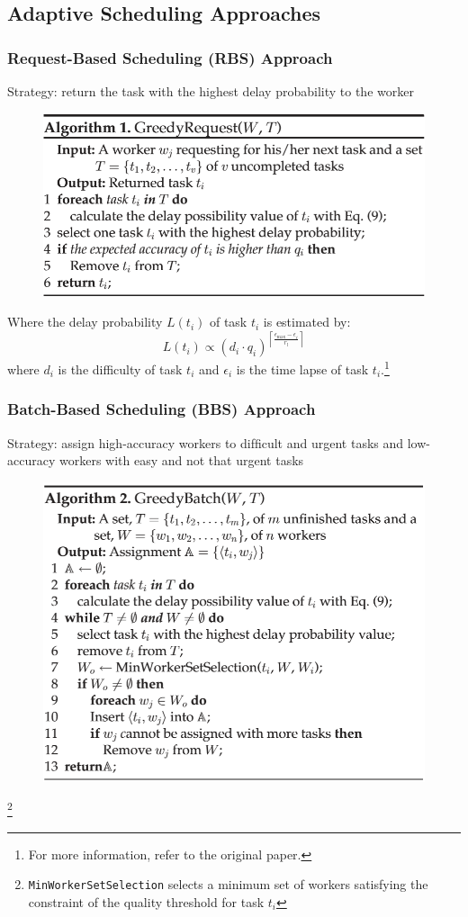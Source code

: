 \documentclass[UTF8]{beamer}
\begin{document}
\subsection{Adaptive Scheduling Approaches}

\begin{frame}
    \frametitle{Request-Based Scheduling (RBS) Approach}
    Strategy: return the task with the highest delay probability to the worker
    \begin{figure}
        \includegraphics[width= 0.65\linewidth]{ALGO1.png}
     \end{figure}
     Where the delay probability $L(t_i)$ of task $t_i$ is estimated by:
     $$
     L\left(t_{i}\right) \propto\left(d_{i} \cdot q_{i}\right)^{\left\lceil\frac{\epsilon_{\max }-\epsilon_{i}}{r_{l}}\right\rceil}
     $$
     where $d_i$ is the difficulty of task $t_i$ and $\epsilon_i$ 
     is the time lapse of task $t_i$.\footnote[1]{For more information, refer to the original paper.}
\end{frame}

\begin{frame}
    \frametitle{Batch-Based Scheduling (BBS) Approach}
    Strategy: assign high-accuracy workers to 
    difﬁcult and urgent tasks and low-accuracy 
    workers with easy and not that urgent tasks
    \begin{figure}
        \includegraphics[width= 0.6\linewidth]{ALGO2.png}
     \end{figure}
    \footnote{\texttt{MinWorkerSetSelection} selects a minimum set of workers 
    satisfying the constraint of the 
    quality threshold for task $t_i$}
\end{frame}
\end{document}
